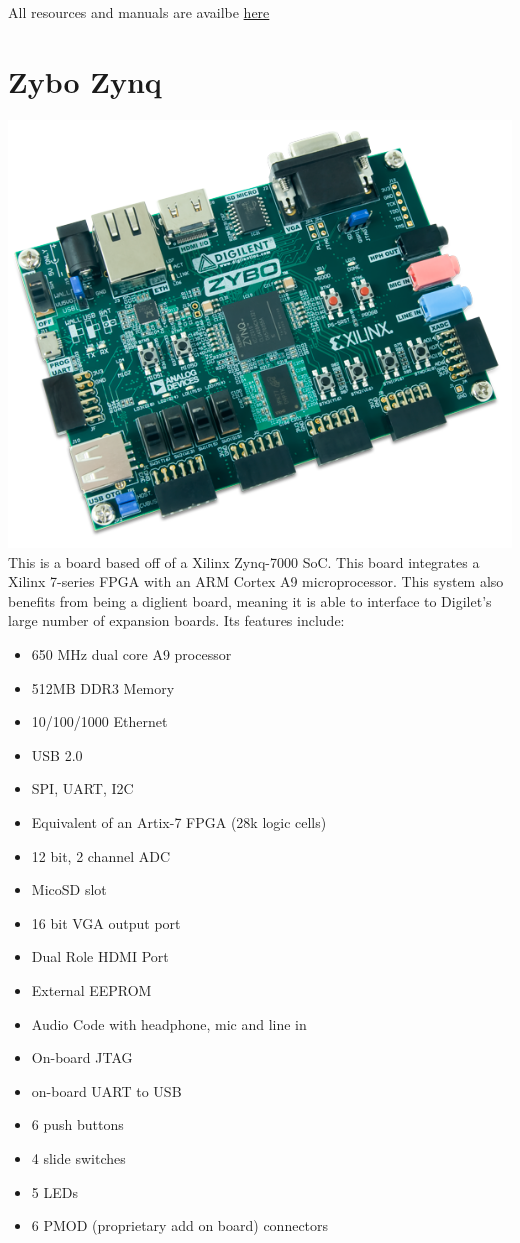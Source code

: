 \documentclass{article}
\begin{document}
		All resources and manuals are availbe
		\href{http://www.terasic.com.tw/cgi-bin/page/archive.pl?Language=English&CategoryNo=165&No=502&PartNo=4}{here}
	
	\newpage
	\section{Zybo Zynq}
	\includegraphics[scale=0.5]{ZYBO}
	This is a board based off of a Xilinx Zynq-7000 SoC. This board integrates a Xilinx 7-series FPGA with an ARM Cortex
	A9 microprocessor. This system also benefits from being a diglient board, meaning it is able to interface to
	Digilet's large number of expansion boards. Its features include:
	\begin{itemize}
	\item 650 MHz dual core A9 processor
	\item 512MB DDR3 Memory
	\item 10/100/1000 Ethernet
	\item USB 2.0
	\item SPI, UART, I2C
	\item Equivalent of an Artix-7 FPGA (28k logic cells)
	\item 12 bit, 2 channel ADC
	\item MicoSD slot
	\item 16 bit VGA output port
	\item Dual Role HDMI Port
	\item External EEPROM
	\item Audio Code with headphone, mic and line in
	\item On-board JTAG 
	\item on-board UART to USB 
	\item 6 push buttons
	\item 4 slide switches
	\item 5 LEDs
	\item 6 PMOD (proprietary add on board) connectors
	\end{itemize}
	
\end{document}

